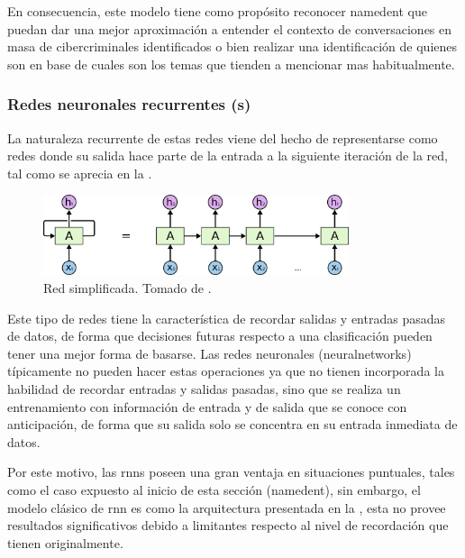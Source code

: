 En consecuencia, este modelo tiene como propósito reconocer \gls{namedent} que puedan dar una mejor aproximación a entender el contexto de conversaciones en masa de cibercriminales identificados o bien realizar una identificación de quienes son en base de cuales son los temas que tienden a mencionar mas habitualmente.

\subsubsection{Redes neuronales recurrentes (s)}
La naturaleza recurrente de estas redes viene del hecho de representarse como redes donde su salida hace parte de la entrada a la siguiente iteración de la red, tal como se aprecia en la .

\begin{figure}[H]
  \centering
  \includegraphics[width=0.8\textwidth]{Figures/RNN-unrolled.png}
\decoRule
\caption[Red  simplificada]{Red  simplificada. Tomado de \cite{understanding-lstm}.}
\label{fig:rnn-classic-simple}
\end{figure}

Este tipo de redes tiene la característica de recordar salidas y entradas pasadas de datos, de forma que decisiones futuras respecto a una clasificación pueden tener una mejor forma de basarse. Las redes neuronales (\glspl{neuralnetwork}) típicamente no pueden hacer estas operaciones ya que no tienen incorporada la habilidad de recordar entradas y salidas pasadas, sino que se realiza un entrenamiento con información de entrada y de salida que se conoce con anticipación, de forma que su salida solo se concentra en su entrada inmediata de datos.

Por este motivo, las \glspl{rnn} poseen una gran ventaja en situaciones puntuales, tales como el caso expuesto al inicio de esta sección (\gls{namedent}), sin embargo, el modelo clásico de \gls{rnn} es como la arquitectura presentada en la , esta no provee resultados significativos debido a limitantes respecto al nivel de recordación que tienen originalmente.

